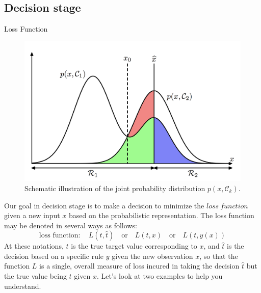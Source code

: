 \documentclass{bredelebeamer}
\begin{document}
\subsection{Decision stage}
\begin{frame}{Loss Function}
  \begin{justify}
    \begin{figure}
    \centering
    \includegraphics[scale=0.17]{classification_joint_dist.png}
    \caption{
      Schematic illustration of the joint probability distribution $p(x,\mathcal{C}_k)$.
    }
    \end{figure}

    Our goal in decision stage is to make a decision to minimize the $\mathit{loss\ function}$
    given a new input $x$ based on the probabilistic representation. The loss
    function may be denoted in several ways as follows:
    \begin{equation}
      \textrm{loss\ function}: \quad L(t, \hat{t})
             \quad \textrm{or} \quad L(t, x)
             \quad \textrm{or} \quad L(t, y(x))
    \end{equation}
    At these notations, $t$ is the true target value corresponding to $x$, and
    $\hat{t}$ is the decision based on a specific rule $y$ given the new
    observation $x$, so that the function $L$ is a single, overall measure of
    loss incured in taking the decision $\hat{t}$ but the true value being $t$
    given $x$. Let's look at two examples to help you understand.
  \end{justify}
\end{frame}
\end{document}
